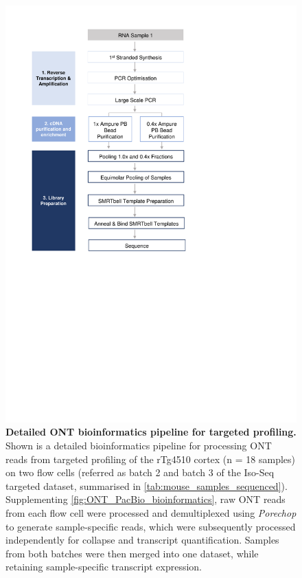 \begin{figure}[htp]
	\centering
	\includegraphics[page=16,trim={0cm 8cm 0cm 0cm},clip,scale = 0.8]{Figures/ProjectDevelopment_Figures}
	\captionsetup{width=0.95\textwidth,singlelinecheck=off}
	\caption[Detailed ONT bioinformatics pipeline for targeted profiling]%
	{\textbf{Detailed ONT bioinformatics pipeline for targeted profiling.} Shown is a detailed bioinformatics pipeline for processing ONT reads from targeted profiling of the rTg4510 cortex (n = 18 samples) on two flow cells (referred as batch 2 and batch 3 of the Iso-Seq targeted dataset, summarised in \cref{tab:mouse_samples_sequenced}). Supplementing \cref{fig:ONT_PacBio_bioinformatics}, raw ONT reads from each flow cell were processed and demultiplexed using \textit{Porechop} to generate sample-specific reads, which were subsequently processed independently for collapse and transcript quantification. Samples from both batches were then merged into one dataset, while retaining sample-specific transcript expression. 
	}
	\label{fig:ONT_Targeted_bioinformatics}
\end{figure}


